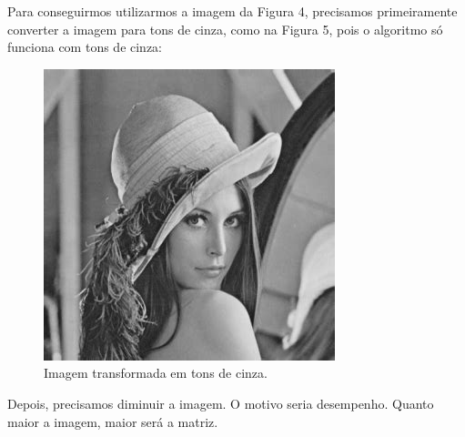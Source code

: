 \documentclass[12pt]{article}
\begin{document}
	Para conseguirmos utilizarmos a imagem da Figura 4, precisamos primeiramente converter a imagem para tons de cinza, como na Figura 5, pois o algoritmo só funciona com tons de cinza:
			\begin{figure}[ht!]
		\centering
		\includegraphics[width=\textwidth]{grayscaled}
		\caption{Imagem transformada em tons de cinza.}
	\end{figure}
	
	Depois, precisamos diminuir a imagem. 
	O motivo seria desempenho. Quanto maior a imagem, maior será a matriz.
	
\end{document}
